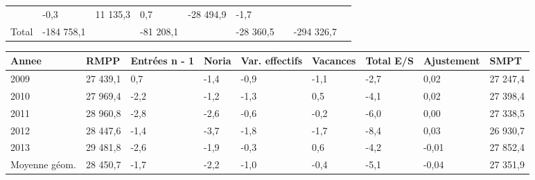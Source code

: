 \begin{longtable}[]{@{}lllllllll@{}}
\begin{minipage}[t]{0.16\columnwidth}
\end{minipage} & \begin{minipage}[t]{0.06\columnwidth}\raggedright
-0,3\strut
\end{minipage} & \begin{minipage}[t]{0.12\columnwidth}\raggedright
11 135,3\strut
\end{minipage} & \begin{minipage}[t]{0.06\columnwidth}\raggedright
0,7\strut
\end{minipage} & \begin{minipage}[t]{0.09\columnwidth}\raggedright
-28 494,9\strut
\end{minipage} & \begin{minipage}[t]{0.06\columnwidth}\raggedright
-1,7\strut
\end{minipage}\tabularnewline
\begin{minipage}[t]{0.05\columnwidth}\raggedright
Total\strut
\end{minipage} & \begin{minipage}[t]{0.10\columnwidth}\raggedright
-184 758,1\strut
\end{minipage} & \begin{minipage}[t]{0.06\columnwidth}\raggedright
\strut
\end{minipage} & \begin{minipage}[t]{0.16\columnwidth}\raggedright
-81 208,1\strut
\end{minipage} & \begin{minipage}[t]{0.06\columnwidth}\raggedright
\strut
\end{minipage} & \begin{minipage}[t]{0.12\columnwidth}\raggedright
-28 360,5\strut
\end{minipage} & \begin{minipage}[t]{0.06\columnwidth}\raggedright
\strut
\end{minipage} & \begin{minipage}[t]{0.09\columnwidth}\raggedright
-294 326,7\strut
\end{minipage} & \begin{minipage}[t]{0.06\columnwidth}\raggedright
\strut
\end{minipage}\tabularnewline
\bottomrule
\end{longtable}

\begin{longtable}[]{@{}lllllllll@{}}
\toprule
Annee & RMPP & Entrées n - 1 & Noria & Var. effectifs & Vacances & Total
E/S & Ajustement & SMPT\tabularnewline
\midrule
\endhead
2009 & 27 439,1 & 0,7 & -1,4 & -0,9 & -1,1 & -2,7 & 0,02 & 27
247,4\tabularnewline
2010 & 27 969,4 & -2,2 & -1,2 & -1,3 & 0,5 & -4,1 & 0,02 & 27
398,4\tabularnewline
2011 & 28 960,8 & -2,8 & -2,6 & -0,6 & -0,2 & -6,0 & 0,00 & 27
338,5\tabularnewline
2012 & 28 447,6 & -1,4 & -3,7 & -1,8 & -1,7 & -8,4 & 0,03 & 26
930,7\tabularnewline
2013 & 29 481,8 & -2,6 & -1,9 & -0,3 & 0,6 & -4,2 & -0,01 & 27
852,4\tabularnewline
Moyenne géom. & 28 450,7 & -1,7 & -2,2 & -1,0 & -0,4 & -5,1 & -0,04 & 27
351,9\tabularnewline
\bottomrule
\end{longtable}

